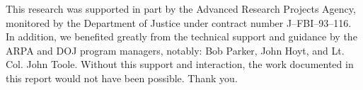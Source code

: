 \documentclass[11pt]{report}
\begin{document}
This research was supported in part by the Advanced Research Projects
Agency, monitored by the Department of Justice under contract number
J--FBI--93--116.  In addition, we benefited greatly from the technical
support and guidance by the ARPA and DOJ program managers, notably: Bob
Parker, John Hoyt, and Lt. Col. John Toole.  Without this support and
interaction, the work documented in this report would not have been
possible.  Thank you.
\end{document}
